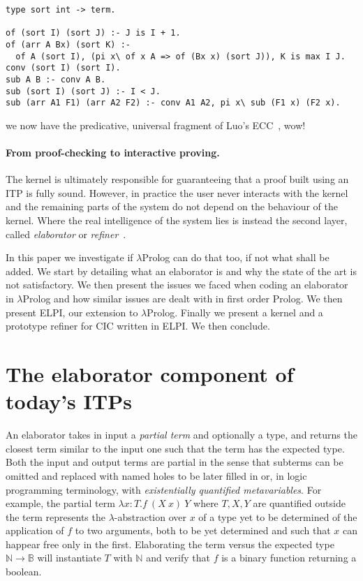 \documentclass{easychair}
\begin{document}
\begin{verbatim}
type sort int -> term.

of (sort I) (sort J) :- J is I + 1.
of (arr A Bx) (sort K) :-
  of A (sort I), (pi x\ of x A => of (Bx x) (sort J)), K is max I J.
conv (sort I) (sort I).
sub A B :- conv A B.
sub (sort I) (sort J) :- I < J.
sub (arr A1 F1) (arr A2 F2) :- conv A1 A2, pi x\ sub (F1 x) (F2 x).
\end{verbatim}

\noindent
we now have the predicative, universal fragment of Luo's ECC~\cite{luo}, wow!


\paragraph{From proof-checking to interactive proving.}

The kernel is ultimately responsible for guaranteeing that a proof
built using an ITP is fully sound. However, in practice the user never
interacts with the kernel and the remaining parts of the system do not
depend on the behaviour of the kernel. Where the real intelligence of
the system lies is instead the second layer, called \emph{elaborator}
or \emph{refiner}~\cite{??,??,??}.


In this paper we investigate if $\lambda$Prolog can do that too, if not
what shall be added.  We start by detailing what an elaborator is and
why the state of the art is not satisfactory.  We then present the
issues
we faced when coding an elaborator in $\lambda$Prolog and how similar issues are
dealt with in first order Prolog.  We then present ELPI, our extension to
$\lambda$Prolog.  Finally we present a kernel and a prototype refiner for CIC
written in ELPI.  We then conclude.

\section{The elaborator component of today's ITPs}

An elaborator takes in input a \emph{partial term} and optionally a
type, and returns the closest term similar to the input one such that
the term has the expected type. Both the input and output terms are
partial in the sense that subterms can be omitted and replaced with
named holes to be later filled in or, in logic programming
terminology, with \emph{existentially quantified metavariables}. For
example, the partial term $\lambda x: T. f~(X~x)~Y$ where $T,X,Y$ are
quantified outside the term represents the $\lambda$-abstraction over
$x$ of a type yet to be determined of the application of $f$ to two
arguments, both to be yet determined and such that $x$ can happear
free only in the first. Elaborating the term versus the expected type
$\mathbb{N} \to \mathbb{B}$ will instantiate $T$ with $\mathbb{N}$ and
verify that $f$ is a binary function returning a boolean.
\end{document}
